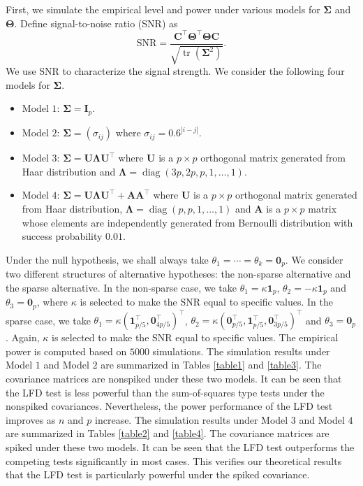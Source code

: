 \documentclass[12pt]{article} %
\DeclareMathOperator{\mytr}{tr}
\DeclareMathOperator{\mydiag}{diag}
\newcommand{\bA}{\mathbf{A}}
\newcommand{\bC}{\mathbf{C}}
\newcommand{\bI}{\mathbf{I}}
\newcommand{\bU}{\mathbf{U}}
\newcommand{\bfsym}[1]{\ensuremath{\boldsymbol{#1}}}
\def\bLambda {\bfsym {\Lambda}}
\def\bSigma {\bfsym {\Sigma}}
\def\bTheta {\bfsym {\Theta}}
\theoremstyle{definition}
\begin{document}
First, we simulate the empirical level and power under various models for $\bSigma$ and $\bTheta$.
Define signal-to-noise ratio (SNR) as
$$
\textrm{SNR}=\frac{ \bC^\top \bTheta^\top \bTheta\bC}{\sqrt{\mytr(\bSigma^2)}}.
$$
We use SNR to characterize the signal strength.
We consider the following four models for $\bSigma$.
\begin{itemize}
    \item Model $1$:
        $\bSigma= \bI_p$.
    \item Model $2$:
        $\bSigma = (\sigma_{ij})$ where $\sigma_{ij}=0.6^{|i-j|}$.
    \item Model $3$:
        $\bSigma= \bU \bLambda \bU^\top$ where $\bU$ is a $p\times p$ orthogonal matrix generated from Haar distribution and $\bLambda=\mydiag(3p,2p,p,1,\ldots,1)$.
    \item Model $4$:
        $\bSigma=  \bU \bLambda \bU^\top+\bA \bA^\top$ where $\bU$ is a $p\times p$ orthogonal matrix generated from Haar distribution, $\bLambda=\mydiag(p,p,1,\ldots,1)$ and $\bA$ is a $p\times p$ matrix whose elements are independently generated from Bernoulli distribution with success probability $0.01$.
\end{itemize}
Under the null hypothesis, we shall always take $\theta_1=\cdots=\theta_k=\mathbf{0}_p$. We consider two different structures of alternative hypotheses: the non-sparse alternative and the sparse alternative.
In the non-sparse case, we take $\theta_1=\kappa \mathbf 1_p$, $\theta_2=-\kappa \mathbf 1_p$ and $\theta_3=\mathbf{0}_p$, where $\kappa$ is selected to make the SNR equal to specific values.
In the sparse case, we take $\theta_1=\kappa (\mathbf 1_{p/5}^\top,\mathbf{0}_{4p/5}^\top)^\top$, $\theta_2=\kappa (\mathbf{0}_{p/5}^\top, \mathbf 1_{p/5}^\top,\mathbf{0}_{3p/5}^\top)^\top$ and $\theta_3=\mathbf{0}_p$.
Again, $\kappa$ is selected to make the SNR equal to specific values.
The empirical power is computed based on $5000$ simulations.
The simulation results under Model $1$ and Model $2$ are summarized in Tables \ref{table1} and \ref{table3}.
The covariance matrices are nonspiked under these two models.
It can be seen that the LFD test is less powerful than the sum-of-squares type tests under the nonspiked covariances.
Nevertheless, the power performance of the LFD test improves as $n$ and $p$ increase.
The simulation results under Model $3$ and Model $4$ are summarized in Tables \ref{table2} and \ref{table4}.
The covariance matrices are spiked under these two models.
It can be seen that the LFD test outperforms the competing tests significantly in most cases.
This verifies our theoretical results that the LFD test is particularly powerful under the spiked covariance.
\end{document}
